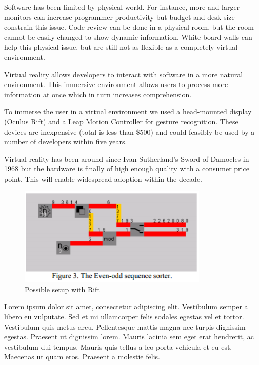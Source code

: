 \documentclass{acm_proc_article-sp}
\begin{document}
Software has been limited by physical world. For instance, more and larger monitors can increase programmer productivity but budget and desk size constrain this issue.
Code review can be done in a physical room, but the room cannot be easily changed to show dynamic information. White-board walls can help this physical issue, but are still not as flexible as a completely virtual environment.

Virtual reality allows developers to interact with software in a more natural environment. This immersive environment allows users to process more information at once which in turn increases comprehension.

To immerse the user in a virtual environment we used a head-mounted display (Oculus Rift) and a Leap Motion Controller for gesture recognition. These devices are inexpensive (total is less than \$500) and could feasibly be used by a number of developers within five years.

Virtual reality has been around since Ivan Sutherland's Sword of Damocles in 1968 but the hardware is finally of high enough quality with a consumer price point. This will enable widespread adoption within the decade.

\begin{figure}[ht!]
\centering
\includegraphics[width=90mm]{EvenOdd}
\caption{Possible setup with Rift \label{overflow}}
\end{figure}

Lorem ipsum dolor sit amet, consectetur adipiscing elit. Vestibulum semper a libero eu vulputate. Sed et mi ullamcorper felis sodales egestas vel et tortor. Vestibulum quis metus arcu. Pellentesque mattis magna nec turpis dignissim egestas. Praesent ut dignissim lorem. Mauris lacinia sem eget erat hendrerit, ac vestibulum dui tempus. Mauris quis tellus a leo porta vehicula et eu est. Maecenas ut quam eros. Praesent a molestie felis.
\end{document}
